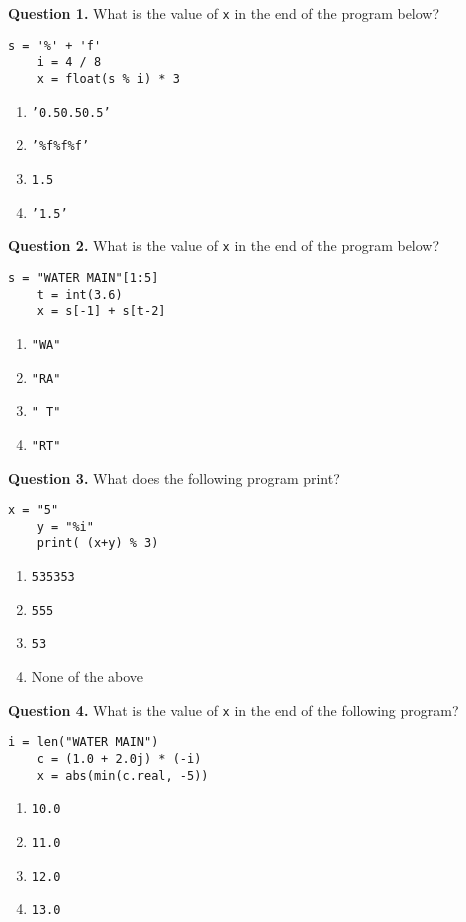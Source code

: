 \documentclass[12pt]{article}
\begin{document}


{\bf Question 1.}  What is the value of \texttt{x} in the end of the program below?
\begin{lstlisting}[frame=single]
	s = '%' + 'f'
	i = 4 / 8
	x = float(s % i) * 3
\end{lstlisting}
\vspace{-0.5cm}
\begin{enumerate}[label=\Alph*]
	\item  \texttt{'0.50.50.5'}
	\item  \texttt{'\%f\%f\%f'}
	\item  \texttt{1.5}
	\item  \texttt{'1.5'}
\end{enumerate}

{\bf Question 2.}    What is the value of \texttt{x} in the end of the program below?
\begin{lstlisting}[frame=single]
  	s = "WATER MAIN"[1:5]
  	t = int(3.6)
  	x = s[-1] + s[t-2]
  \end{lstlisting}
  \vspace{-0.5cm}
  \begin{enumerate}[label=\Alph*]
  	\item  \texttt{"WA"}
  	\item  \texttt{"RA"}
  	\item  \texttt{" T"}
  	\item  \texttt{"RT"}
  \end{enumerate} 


{\bf Question 3.} What does the following program print?
\begin{lstlisting}[frame=single]
    x = "5"
    y = "%i"
    print( (x+y) % 3)
\end{lstlisting}
\vspace{-0.5cm}
\begin{enumerate}[label=\Alph*]
	\item  \texttt{535353}
	\item  \texttt{555}
	\item  \texttt{53}
	\item  None of the above
\end{enumerate}

{\bf Question 4.} What is the value of \texttt{x} in the end of the following program?
\begin{lstlisting}[frame=single]
  	i = len("WATER MAIN")
  	c = (1.0 + 2.0j) * (-i)
  	x = abs(min(c.real, -5))
  \end{lstlisting}
  \vspace{-0.5cm}
  \begin{enumerate}[label=\Alph*]
  	\item  \texttt{10.0}
  	\item  \texttt{11.0}
  	\item  \texttt{12.0}
  	\item  \texttt{13.0}
  \end{enumerate}
\end{document}
